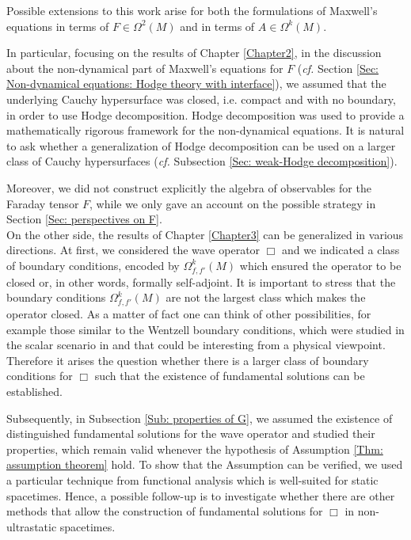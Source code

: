 \vskip1cm


Possible extensions to this work arise for both the formulations of Maxwell's equations in terms of $F\in\Omega^2(M)$ and in terms of $A\in\Omega^k(M)$.\vskip0.25cm

In particular, focusing on the results of Chapter \ref{Chapter2}, in the discussion about the non-dynamical part of Maxwell's equations for $F$ (\emph{cf.} Section \ref{Sec: Non-dynamical equations: Hodge theory with interface}), we assumed that the underlying Cauchy hypersurface was closed, i.e. compact and with no boundary, in order to use Hodge decomposition. Hodge decomposition was used to provide a mathematically rigorous framework for the non-dynamical equations. It is natural to ask whether a generalization of Hodge decomposition can be used on a larger class of Cauchy hypersurfaces (\emph{cf.} Subsection \ref{Sec: weak-Hodge decomposition}).

Moreover, we did not construct explicitly the algebra of observables for the Faraday tensor $F$, while we only gave an account on the possible strategy in Section \ref{Sec: perspectives on F}.\\

On the other side, the results of Chapter \ref{Chapter3} can be generalized in various directions. At first, we considered the wave operator $\Box$ and we indicated a class of boundary conditions, encoded by $\Omega^k_{f,f'}(M)$ which ensured the operator to be closed or, in other words, formally self-adjoint. It is important to stress that the boundary conditions $\Omega^k_{f,f'}(M)$ are not the largest class which makes the operator closed. As a matter of fact one can think of other possibilities, for example those similar to the Wentzell boundary conditions, which were studied in the scalar
scenario in \cite{Dappiaggi-Drago-Ferreira-19,Dappiaggi:2018pju,Zahn:2015due} and that could be interesting from a physical viewpoint. Therefore it arises the question whether there is a larger class of boundary conditions for $\Box$ such that the existence of fundamental solutions can be established.

Subsequently, in Subsection \ref{Sub: properties of G}, we assumed the existence of distinguished fundamental solutions for the wave operator and studied their properties, which remain valid whenever the hypothesis of Assumption \ref{Thm: assumption theorem} hold. To show that the Assumption can be verified, we used a particular technique from functional analysis which is well-suited for static spacetimes. Hence, a possible follow-up is to investigate whether there are other methods that allow the construction of fundamental solutions for $\Box$ in non-ultrastatic spacetimes.\thispagestyle{plain}


